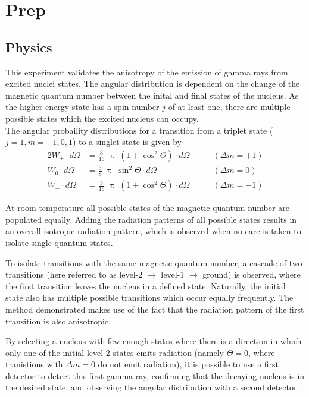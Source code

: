 \setcounter{chapter}{-1}
\chapter{Prep}
\section{Physics}
This experiment validates the anisotropy of the emission of gamma rays from excited nuclei states.
The angular distribution is dependent on the change of the magnetic quantum number between the inital and final states of the nucleus.
As the higher energy state has a spin number $j$ of at least one, there are multiple possible states which the excited nucleus can occupy.\\
The angular probaility distributions for a transition from a triplet state ($j=1, m=-1,0,1$) to a singlet state is given by
\begin{alignat}{2}
	W_+ \cdot d\Omega &= \frac{3}{16} \; \uppi \; (1 + \cos^2 \Theta) \cdot d\Omega \qquad &(\Delta m = +1)\\
	W_0 \cdot d\Omega &= \frac{3}{8} \; \uppi \; \sin^2 \Theta \cdot d\Omega \qquad &(\Delta m = 0)\\
	W_- \cdot d\Omega &= \frac{3}{16} \; \uppi \; (1 + \cos^2 \Theta) \cdot d\Omega \qquad &(\Delta m = -1)
\end{alignat}

At room temperature all possible states of the magnetic quantum number are populated equally.
Adding the radiation patterns of all possible states results in an overall isotropic radiation pattern, which is observed when no care is taken to isolate single quantum states.

To isolate transitions with the same magnetic quantum number, a cascade of two transitions (here referred to as level-2 $\rightarrow$ level-1 $\rightarrow$ ground) is observed, where the first transition leaves the nucleus in a defined state.
Naturally, the initial state also has multiple possible transitions which occur equally frequently.
The method demonstrated makes use of the fact that the radiation pattern of the first transition is also anisotropic.

By selecting a nucleus with few enough states where there is a direction in which only one of the initial level-2 states emits radiation (namely $\Theta = 0$, where tranistions with $\Delta m = 0$ do not emit radiation), it is possible to use a first detector to detect this first gamma ray, confirming that the decaying nucleus is in the desired state, and observing the angular distribution with a second detector.

